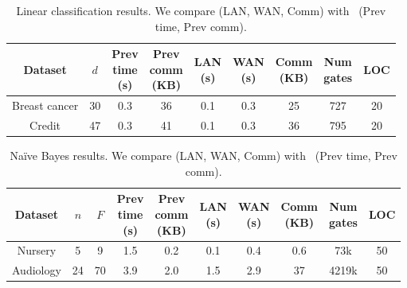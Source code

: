 \setlength\tabcolsep{2.8pt}
\begin{table}
\footnotesize
\begin{tabular}{|c|c|c|c|c|c|c|c|c|}
\hline
Dataset & $d$  & \thead{Prev \\ time\\ (s)} & \thead{Prev \\ comm\\ (KB)} & \thead{LAN  \\ (s)} & \thead{WAN\\ (s)} & \thead{Comm \\(KB)}  &  \thead{Num \\ gates} & LOC\\
\hline
Breast cancer & 30 & 0.3 & 36 & 0.1 & 0.3 & 25  & 727 & 20\\
\hline
Credit & 47 & 0.3 & 41 & 0.1 & 0.3 & 36  & 795 & 20\\
\hline
\end{tabular}
 \caption{Linear classification results. We compare \tool (LAN, WAN, Comm)
 with~\cite{shafindss} (Prev time, Prev comm).}
 \label{tab:lc} 
\end{table}



\setlength\tabcolsep{2.5pt}
\begin{table}
\footnotesize
\begin{tabular}{|c|c|c|c|c|c |c|c|c|c|}
\hline
Dataset & $n$ & $F$ & \thead{Prev \\ time\\ (s)} & \thead{Prev \\ comm\\ (KB)} & \thead{LAN  \\ (s)} & \thead{WAN\\ (s)} & \thead{Comm \\(KB)} & \thead{Num \\ gates}  & LOC\\
\hline
Nursery & 5 & 9 & 1.5 & 0.2 & 0.1 & 0.4 & 0.6  & 73k & 50\\
\hline
Audiology & 24 & 70 & 3.9 & 2.0 & 1.5 & 2.9 & 37  & 4219k & 50\\
\hline
\end{tabular}
\caption{Na\"{i}ve Bayes results. We compare \tool (LAN, WAN, Comm)
 with~\cite{shafindss} (Prev time, Prev comm).}
 \label{tab:nb} 
\end{table}


